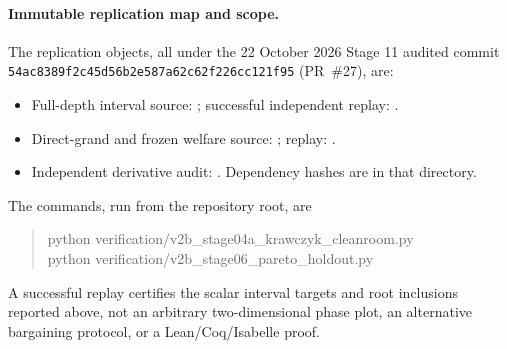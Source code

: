 \paragraph{Immutable replication map and scope.}
The replication objects, all under the 22 October 2026 Stage 11 audited commit \texttt{54ac8389f2c45d56b2e587a62c62f226cc121f95} (PR~\#27), are:
\begin{itemize}\setlength\itemsep{1pt}
\item Full-depth interval source: ; successful independent replay: .
\item Direct-grand and frozen welfare source: ; replay: .
\item Independent derivative audit: . Dependency hashes are in that directory.
\end{itemize}
The commands, run from the repository root, are
\begin{quote}\small\ttfamily
python verification/v2b\_stage04a\_krawczyk\_cleanroom.py\\
python verification/v2b\_stage06\_pareto\_holdout.py
\end{quote}
A successful replay certifies the scalar interval targets and root inclusions reported above, not an arbitrary two-dimensional phase plot, an alternative bargaining protocol, or a Lean/Coq/Isabelle proof.

